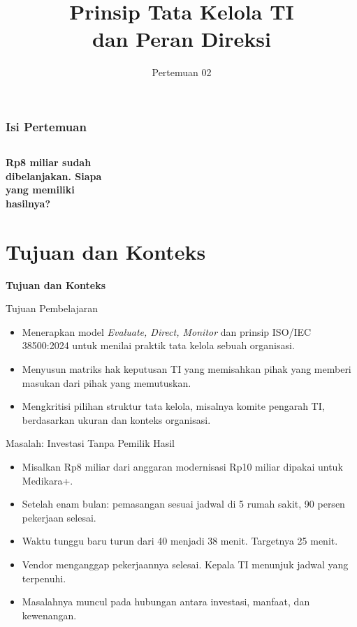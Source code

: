 \documentclass[aspectratio=169, table, 12pt]{beamer}
\title{\Huge Prinsip Tata Kelola TI\\ \vspace{10pt} dan Peran Direksi}
\date{Pertemuan 02}
\begin{document}
\frame{\titlepage}

\begin{frame}
  \frametitle{Isi Pertemuan}
  \vspace{14pt}
  \begin{columns}[t]
    {\small\tableofcontents[sections={1-3}]}

    {\small\tableofcontents[sections={4-7}]}
  \end{columns}
\end{frame}

\begin{frame}{\hfill}
  \centering
  \Huge{\textbf{Rp8 miliar sudah\\dibelanjakan. Siapa\\yang memiliki\\hasilnya?}}
\end{frame}

\section{Tujuan dan Konteks}

\begin{frame}{\hfill}
  \centering
  \Huge{\textbf{Tujuan dan Konteks}}
\end{frame}

\begin{frame}{{\Large Tujuan Pembelajaran}}
  \vspace{10pt}
  \begin{itemize}
    \item Menerapkan model \textit{Evaluate, Direct, Monitor} dan prinsip ISO/IEC
          38500:2024 untuk menilai praktik tata kelola sebuah organisasi.
    \item Menyusun matriks hak keputusan TI yang memisahkan pihak yang memberi masukan
          dari pihak yang memutuskan.
    \item Mengkritisi pilihan struktur tata kelola, misalnya komite pengarah TI,
          berdasarkan ukuran dan konteks organisasi.
  \end{itemize}
\end{frame}

\begin{frame}{{\Large Masalah: Investasi Tanpa Pemilik Hasil}}
  \vspace{6pt}
  \small
  \begin{itemize}
    \item Misalkan Rp8 miliar dari anggaran modernisasi Rp10 miliar dipakai untuk Medikara+.
    \item Setelah enam bulan: pemasangan sesuai jadwal di 5 rumah sakit, 90 persen pekerjaan
          selesai.
    \item Waktu tunggu baru turun dari 40 menjadi 38 menit. Targetnya 25 menit.
    \item Vendor menganggap pekerjaannya selesai. Kepala TI menunjuk jadwal yang terpenuhi.
    \item Masalahnya muncul pada hubungan antara investasi, manfaat, dan kewenangan.
  \end{itemize}
\end{frame}
\end{document}
